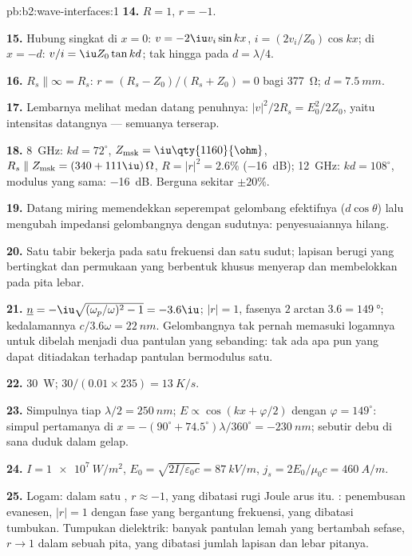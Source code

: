 \begin{solution}{pb:b2:wave-interfaces:1}
\textbf{14.} $R = 1$, $r = -1$.

\textbf{15.} Hubung singkat di $x = 0$: $v = -2\iu v_i\sin kx$, $i = (2v_i/Z_0)\cos kx$;
di $x = -d$: $v/i = \iu Z_0\tan kd$; tak hingga pada $d = \lambda/4$.

\textbf{16.} $R_s \parallel \infty = R_s$: $r = (R_s - Z_0)/(R_s + Z_0) = 0$ bagi
\qty{377}{\ohm}; $d = \qty{7.5}{mm}$.

\textbf{17.} Lembarnya melihat medan datang penuhnya: $|v|^2/2R_s =
E_0^2/2Z_0$, yaitu intensitas datangnya --- semuanya terserap.

\textbf{18.} \qty{8}{GHz}: $kd = 72^\circ$, $Z_{\text{msk}} = \iu\qty{1160}{\ohm}$, $R_s \parallel
Z_{\text{msk}} = (340 + 111\iu)\,\Omega$, $R = |r|^2 = 2.6\%$ (\qty{-16}{dB}); \qty{12}{GHz}:
$kd = 108^\circ$, modulus yang sama: \qty{-16}{dB}. Berguna sekitar $\pm20\%$.

\textbf{19.} Datang miring memendekkan seperempat gelombang efektifnya
($d\cos\theta$) lalu mengubah impedansi gelombangnya dengan sudutnya:
penyesuaiannya hilang.

\textbf{20.} Satu tabir bekerja pada satu frekuensi dan satu sudut; lapisan
berugi yang bertingkat dan permukaan yang berbentuk khusus menyerap dan membelokkan pada pita lebar.

\textbf{21.} $\underline n = -\iu\sqrt{(\omega_p/\omega)^2 - 1} = -3.6\iu$; $|r| = 1$, fasenya
$2\arctan3.6 = \qty{149}{\degree}$; kedalamannya $c/3.6\omega = \qty{22}{nm}$. Gelombangnya tak pernah
memasuki logamnya untuk dibelah menjadi dua pantulan yang sebanding: tak ada
apa pun yang dapat ditiadakan  terhadap pantulan bermodulus satu.

\textbf{22.} \qty{30}{W}; $30/(0.01 \times 235) = \qty{13}{K/s}$.

\textbf{23.} Simpulnya tiap $\lambda/2 = \qty{250}{nm}$; $E \propto \cos(kx + \varphi/2)$ dengan $\varphi =
149^\circ$: simpul pertamanya di $x = -(90^\circ + 74.5^\circ)\lambda/360^\circ = \qty{-230}{nm}$; sebutir
debu di sana duduk dalam gelap.

\textbf{24.} $I = \qty{1e7}{W/m^2}$, $E_0 = \sqrt{2I/\varepsilon_0c} = \qty{87}{kV/m}$, $j_s =
2E_0/\mu_0c = \qty{460}{A/m}$.

\textbf{25.} Logam:  dalam satu , $r \approx -1$, yang dibatasi
rugi Joule arus itu. : penembusan evanesen,
$|r| = 1$ dengan fase yang bergantung frekuensi, yang dibatasi tumbukan.
Tumpukan dielektrik: banyak pantulan lemah yang bertambah sefase, $r \to 1$ dalam sebuah
pita, yang dibatasi jumlah lapisan dan lebar pitanya.
\end{solution}
